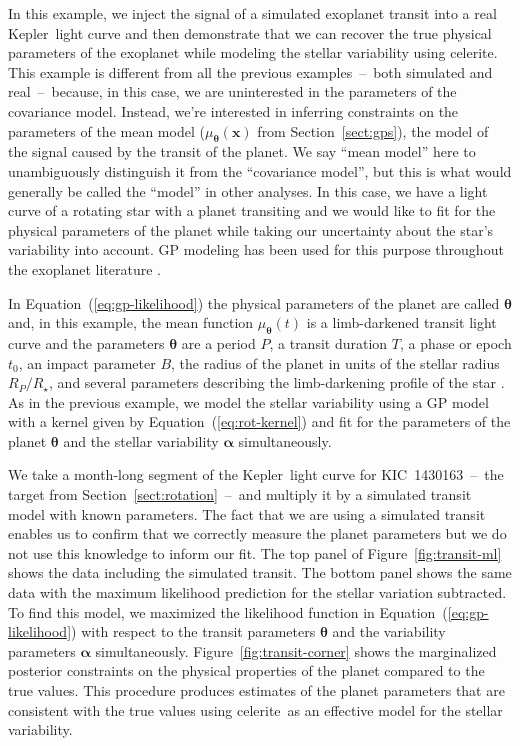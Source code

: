 \documentclass[manuscript, letterpaper]{aastex6}
\newcommand{\project}[1]{\textsf{#1}}
\newcommand{\kepler}{\project{Kepler}}
\newcommand{\celerite}{\project{celerite}}
\newcommand{\figureref}[1]{\ref{fig:#1}}
\newcommand{\Figure}[1]{Figure~\figureref{#1}}
\renewcommand{\eqref}[1]{\ref{eq:#1}}
\newcommand{\Eq}[1]{Equation~(\eqref{#1})}
\newcommand{\eq}[1]{\Eq{#1}}
\newcommand{\sectionname}{Section}
\newcommand{\sectref}[1]{\ref{sect:#1}}
\newcommand{\Sect}[1]{\sectionname~\sectref{#1}}
\newcommand{\sect}[1]{\Sect{#1}}
\newcommand{\bvec}[1]{{\ensuremath{\boldsymbol{#1}}}}
\begin{document}
In this example, we inject the signal of a simulated exoplanet transit into a
real \kepler\ light curve and then demonstrate that we can recover the true
physical parameters of the exoplanet while modeling the stellar variability
using \celerite.
This example is different from all the previous examples~--~both simulated and
real~--~because, in this case, we are uninterested in the parameters of the
covariance model.
Instead, we're interested in inferring constraints on the parameters of the
mean model ($\mu_\bvec{\theta}(\bvec{x})$ from \sect{gps}), the model of the
signal caused by the transit of the planet.
We say ``mean model'' here to unambiguously distinguish it from the
``covariance model'', but this is what would generally be called the ``model''
in other analyses.
In this case, we have a light curve of a rotating star with a planet
transiting and we would like to fit for the physical parameters of the planet
while taking our uncertainty about the star's variability into account.
GP modeling has been used for this purpose throughout the exoplanet literature
\citep[for example][]{Dawson:2014, Barclay:2015, Evans:2015,
Foreman-Mackey:2016b, Grunblatt:2016}.

In \eq{gp-likelihood} the physical parameters of the planet are called
$\bvec{\theta}$ and, in this example, the mean function $\mu_\bvec{\theta}(t)$
is a limb-darkened transit light curve \citep{Mandel:2002} and the parameters
$\bvec{\theta}$ are a period $P$, a transit duration $T$, a phase or epoch
$t_0$, an impact parameter $B$, the radius of the planet in units of the
stellar radius $R_P/R_\star$, and several parameters describing the
limb-darkening profile of the star \citep{Claret:2011}.
As in the previous example, we model the stellar variability using a GP model
with a kernel given by \eq{rot-kernel} and fit for the parameters of the
planet $\bvec{\theta}$ and the stellar variability $\bvec{\alpha}$
simultaneously.

We take a month-long segment of the \kepler\ light curve for
KIC~1430163~--~the target from \sect{rotation}~--~and multiply it by a
simulated transit model with known parameters.
The fact that we are using a simulated transit enables us to confirm that we
correctly measure the planet parameters but we do not use this knowledge to
inform our fit.
The top panel of \Figure{transit-ml} shows the data including the simulated
transit.
The bottom panel shows the same data with the maximum likelihood prediction
for the stellar variation subtracted.
To find this model, we maximized the likelihood function in \eq{gp-likelihood}
with respect to the transit parameters $\bvec{\theta}$ and the variability
parameters $\bvec{\alpha}$ simultaneously.
\Figure{transit-corner} shows the marginalized posterior constraints on the
physical properties of the planet compared to the true values.
This procedure produces estimates of the planet parameters that are consistent
with the true values using \celerite\ as an effective model for the stellar
variability.
\end{document}
